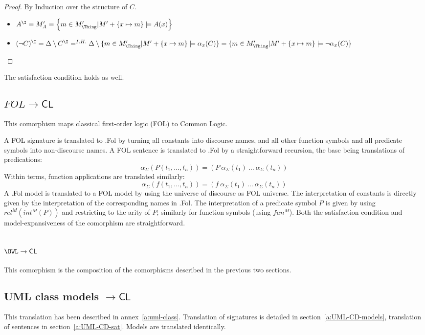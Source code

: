 \documentclass[10pt,fleqn,final]{scrreprt}
\newcommand*{\CL}{\ensuremath{\mathsf{CL}}\xspace}
\newcommand{\ssclause}[1]{\subsection{#1}}
\providecommand{\DIFaddbegin}{} %
\providecommand{\DIFaddend}{} %
\providecommand{\DIFdelbegin}{} %
\providecommand{\DIFdelend}{} %
\begin{document}
	\begin{proof} By Induction over the structure of $C$.
\begin{itemize}
	\item $A^\I = M'_A = \left \{m \in M'_{\Thing} \vert M' + \{x \mapsto m \} \models A(x)  \right\}$
	\item $(\lnot C)^\I = \Delta \setminus C^\I =^{I.H.} \Delta \setminus \{m \in M'_\Thing \lvert M' + \{x \mapsto m\} \models \alpha_x(C)\} = \{m \in M'_\Thing \vert M' + \{x \mapsto m\} \models \lnot \alpha_x(C)\}$
\end{itemize}
	\end{proof}

	The satisfaction condition holds as well.

\ssclause{$FOL \rightarrow \CL$}

This comorphism  maps classical first-order logic (FOL) to Common Logic.


A FOL signature is translated to \Clogic.Fol by turning all constants
into discourse names, and all other function symbols and all predicate
symbols into non-discourse names. A FOL sentence is translated
to \Clogic.Fol by a straightforward recursion, the base being translations
of predications:
$$\alpha_\Sigma(P(t_1,\ldots,t_n)) = (P\ \alpha_\Sigma(t_1)\ \ldots\ \alpha_\Sigma(t_n))$$
Within terms, function applications are translated similarly:
$$\alpha_\Sigma(f(t_1,\ldots,t_n)) = (f\ \alpha_\Sigma(t_1)\ \ldots\ \alpha_\Sigma(t_n))$$
A \Clogic.Fol model is translated to a FOL model by using the universe of
discourse as FOL universe. The interpretation of constants is
directly given by the interpretation of the corresponding names
in \Clogic.Fol. The interpretation of a predicate symbol $P$ is given
by using $rel^M(int^M(P))$ and restricting to the arity of $P$;
similarly for function symbols (using $fun^M$). Both the satisfaction condition
and model-expansiveness of the comorphism are straightforward.

\ssclause{$\OWL \rightarrow \CL$}

This comorphism is the composition of the comorphisms described in the previous
two sections.

\DIFdelbegin %
\DIFdelend \DIFaddbegin \ssclause{UML class models $\to \CL$}
\DIFaddend This translation has been described in annex~\ref{a:uml-class}. 
Translation of signatures is detailed in section~\ref{a:UML-CD-models},
translation of sentences in section~\ref{a:UML-CD-sat}.
Models are translated identically.
\end{document}
